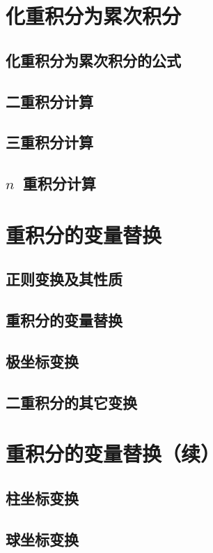 \section{化重积分为累次积分}
\subsection{化重积分为累次积分的公式}
\subsection{二重积分计算}
\subsection{三重积分计算}
\subsection{$n$~重积分计算}
\begin{exercise}
\item
\end{exercise}
\section{重积分的变量替换}
\subsection{正则变换及其性质}
\subsection{重积分的变量替换}
\subsection{极坐标变换}
\subsection{二重积分的其它变换}
\begin{exercise}
\item
\end{exercise}
\section{重积分的变量替换（续）}
\subsection{柱坐标变换}
\subsection{球坐标变换}
